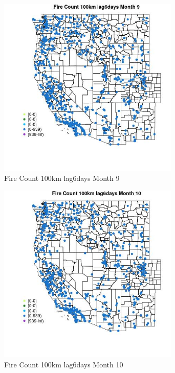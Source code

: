 \begin{figure} 
\centering  
\includegraphics[width=0.77\textwidth]{Code_Outputs/Report_ML_input_PM25_Step4_part_e_de_duplicated_aves_compiled_2019-05-21wNAs_MapObsMo9Fire_Count_100km_lag6days.jpg} 
\caption{\label{fig:Report_ML_input_PM25_Step4_part_e_de_duplicated_aves_compiled_2019-05-21wNAsMapObsMo9Fire_Count_100km_lag6days}Fire Count 100km lag6days Month 9} 
\end{figure} 
 

\begin{figure} 
\centering  
\includegraphics[width=0.77\textwidth]{Code_Outputs/Report_ML_input_PM25_Step4_part_e_de_duplicated_aves_compiled_2019-05-21wNAs_MapObsMo10Fire_Count_100km_lag6days.jpg} 
\caption{\label{fig:Report_ML_input_PM25_Step4_part_e_de_duplicated_aves_compiled_2019-05-21wNAsMapObsMo10Fire_Count_100km_lag6days}Fire Count 100km lag6days Month 10} 
\end{figure} 
 

